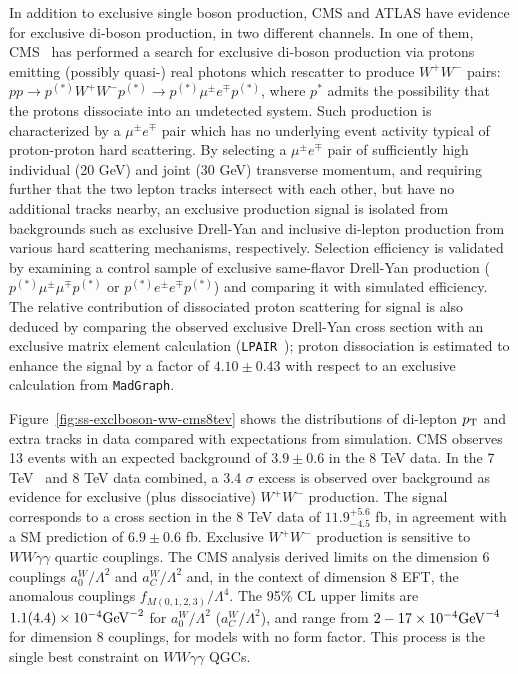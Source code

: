 
In addition to exclusive single boson production, CMS and ATLAS have
evidence for exclusive di-boson production, in two different channels.
In one of them, CMS~\cite{Khachatryan:2016mud} has performed a search
for exclusive di-boson production via protons emitting (possibly
quasi-) real photons which rescatter to produce $W^+W^-$ pairs:
$pp \to p^{(*)}W^+ W^- p^{(*)} \to p^{(*)}\mu^{\pm}e^{\mp}p^{(*)}$,
where $p^*$ admits the possibility that the protons dissociate into an
undetected system.  Such production is characterized by a
$\mu^{\pm}e^{\mp}$ pair which has no underlying event activity typical
of proton-proton hard scattering.  By selecting a $\mu^{\pm}e^{\mp}$
pair of sufficiently high individual (20 GeV) and joint (30 GeV)
transverse momentum, and requiring further that the two lepton tracks
intersect with each other, but have no additional tracks nearby, an
exclusive production signal is isolated from backgrounds such as
exclusive Drell-Yan and inclusive di-lepton production from various
hard scattering mechanisms, respectively.  Selection efficiency is
validated by examining a control sample of exclusive same-flavor
Drell-Yan production ($p^{(*)}\mu^{\pm}\mu^{\mp}p^{(*)}$ or
$p^{(*)}e^{\pm}e^{\mp}p^{(*)}$) and comparing it with simulated
efficiency.  The relative contribution of dissociated proton
scattering for signal is also deduced by comparing the observed
exclusive Drell-Yan cross section with an exclusive matrix element
calculation (\texttt{LPAIR}~\cite{Vermaseren:1982cz,Baranov:1991yq});
proton dissociation is estimated to enhance the signal by a factor of
$4.10 \pm 0.43$ with respect to an exclusive calculation
from \texttt{MadGraph}.

Figure~\ref{fig:ss-exclboson-ww-cms8tev} shows the distributions of
di-lepton $p_{\mathrm{T}}$ and extra tracks in data compared with expectations
from simulation.  CMS observes 13 events with an expected background
of $3.9\pm0.6$ in the 8 TeV data.  In the 7
TeV~\cite{Chatrchyan:2013foa} and 8 TeV data combined, a 3.4 $\sigma$
excess is observed over background as evidence for exclusive (plus
dissociative) $W^+W^-$ production.  The signal corresponds to a cross
section in the 8 TeV data of $11.9^{+5.6}_{-4.5}$ fb, in agreement
with a SM prediction of $6.9\pm0.6$ fb.  Exclusive $W^+W^-$ production
is sensitive to $WW\gamma\gamma$ quartic couplings. The CMS analysis
derived limits on the dimension 6 couplings $a^W_0/\Lambda^2$ and
$a^W_C/\Lambda^2$ and, in the context of dimension 8 EFT, the
anomalous couplings $f_{M(0,1,2,3)}/\Lambda^4$.  The 95\% CL upper
limits are $1.1(4.4)\times 10^{-4} \rm{GeV}^{-2}$ for
$a^W_0/\Lambda^2$ ($a^W_C/\Lambda^2$), and range from $2-17 \times
10^{-4} \rm{GeV}^{-4}$ for dimension 8 couplings, for models with no
form factor.  This process is the single best constraint on
$WW\gamma\gamma$ QGCs.

